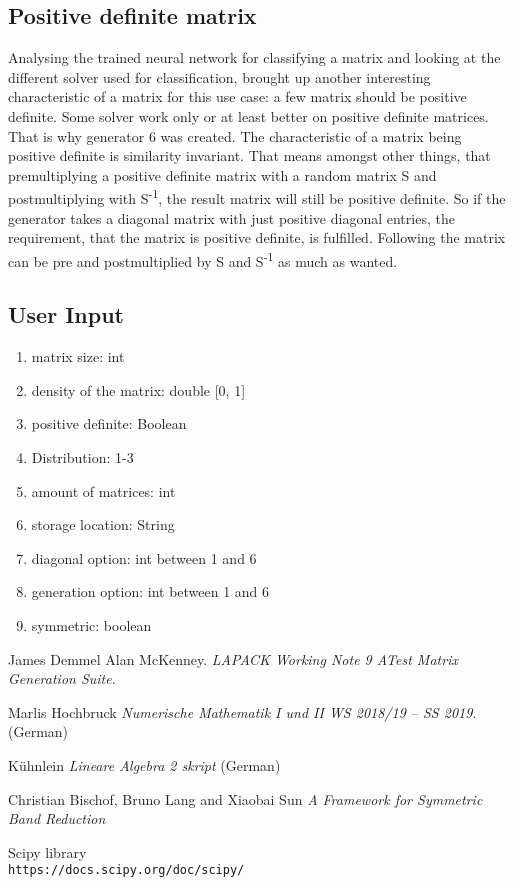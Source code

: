 \documentclass[parskip=full]{scrartcl}
\begin{document}
\subsection{Positive definite matrix}
Analysing the trained neural network for classifying a matrix and looking at the different solver used for classification, brought up another interesting characteristic of a matrix for this use case: a few matrix should be positive definite.
Some solver work only or at least better on positive definite matrices. 
That is why generator 6 was created. 
The characteristic of a matrix being positive definite is similarity invariant. 
That means amongst other things, that premultiplying a positive definite matrix with a random matrix S and postmultiplying with S\textsuperscript{-1}, the result matrix will still be positive definite. 
So if the generator takes a diagonal matrix with just positive diagonal entries, the requirement, that the matrix is positive definite, is fulfilled.
Following the matrix can be pre and postmultiplied by S and S\textsuperscript{-1} as much as wanted. 


\subsection{User Input}
\begin{enumerate}
	\item matrix size: int
	\item density of the matrix: double [0, 1]
	\item positive definite: Boolean
	\item Distribution: 1-3
	\item amount of matrices: int
	\item storage location: String
	\item diagonal option: int between 1 and 6
	\item generation option: int between 1 and 6
	\item symmetric: boolean
\end{enumerate}

\newpage

\begin{thebibliography}{9}
	James Demmel Alan McKenney. 
	\textit{LAPACK Working Note 9 ATest Matrix Generation Suite}. 
	
	Marlis Hochbruck
	\textit{Numerische Mathematik I und II WS 2018/19 – SS 2019}. (German)  
	
	Kühnlein
	\textit{Lineare Algebra 2 skript} (German)
	
	Christian Bischof, Bruno Lang and Xiaobai Sun
	\textit{A Framework for Symmetric Band Reduction}
	
	Scipy library
	\\\texttt{https://docs.scipy.org/doc/scipy/}


\end{thebibliography}
\end{document}

